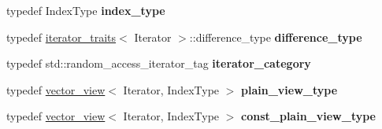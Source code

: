 \begin{DoxyCompactItemize}
\item 
\mbox{\label{structcugar_1_1vector__view_a921bd09fcfa0fafc8c9c0966e64da088}} 
typedef Index\+Type {\bfseries index\+\_\+type}
\item 
\mbox{\label{structcugar_1_1vector__view_a506e15289e1ba21852d638ce56c3e5af}} 
typedef \hyperlink{structcugar_1_1iterator__traits}{iterator\+\_\+traits}$<$ Iterator $>$\+::difference\+\_\+type {\bfseries difference\+\_\+type}
\item 
\mbox{\label{structcugar_1_1vector__view_aa7a416cbd1d46d1bf183fdb68371faff}} 
typedef std\+::random\+\_\+access\+\_\+iterator\+\_\+tag {\bfseries iterator\+\_\+category}
\item 
\mbox{\label{structcugar_1_1vector__view_a011a9a4dd162329e2d5b44915893c5f6}} 
typedef \hyperlink{structcugar_1_1vector__view}{vector\+\_\+view}$<$ Iterator, Index\+Type $>$ {\bfseries plain\+\_\+view\+\_\+type}
\item 
\mbox{\label{structcugar_1_1vector__view_a2f6a905df3358f51cb3d9775469d9ed1}} 
typedef \hyperlink{structcugar_1_1vector__view}{vector\+\_\+view}$<$ Iterator, Index\+Type $>$ {\bfseries const\+\_\+plain\+\_\+view\+\_\+type}
\end{DoxyCompactItemize}
